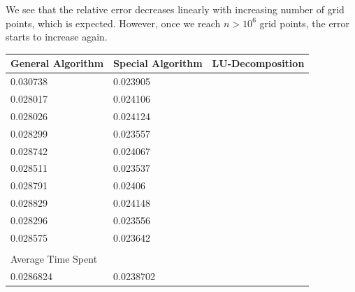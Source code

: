 \documentclass[a4paper,10pt]{article}
\begin{document}
We see that the relative error decreases linearly with increasing number of grid points, which is expected. However, once we reach $n > 10^6$ grid points, the error starts to increase again. 



\begin{table}[h]  \label{fig:5}
\begin{tabular}{lll}
\hline
General Algorithm  & Special Algorithm & LU-Decomposition \\
\hline
0.030738           & 0.023905          &                  \\
0.028017           & 0.024106          &                  \\
0.028026           & 0.024124          &                  \\
0.028299           & 0.023557          &                  \\
0.028742           & 0.024067          &                  \\
0.028511           & 0.023537          &                  \\
0.028791           & 0.02406           &                  \\
0.028829           & 0.024148          &                  \\
0.028296           & 0.023556          &                  \\
0.028575           & 0.023642          &                  \\
                   &                   &                  \\\hline
Average Time Spent &                   &                  \\
\hline
0.0286824          & 0.0238702         &                 
\end{tabular}
\end{table}
\end{document}
